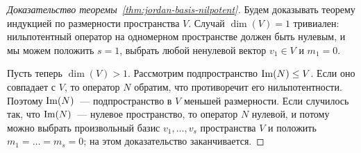 \begin{proof}[Доказательство теоремы~\ref{thm:jordan-basis-nilpotent}]
Будем доказывать теорему индукцией по размерности пространства $V$.
Случай $\dim(V)=1$ тривиален: нильпотентный оператор на одномерном
пространстве должен быть нулевым, и мы можем положить $s=1$, выбрать
любой ненулевой вектор $v_1\in V$ и $m_1=0$.

Пусть теперь $\dim(V)>1$. Рассмотрим подпространство $\operatorname{Im}(N)\leq V$.
Если оно совпадает с $V$, то оператор $N$ обратим, что противоречит
его нильпотентности. Поэтому $\operatorname{Im}(N)$~--- подпространство в $V$
меньшей размерности.
Если случилось так, что $\operatorname{Im}(N)$~--- нулевое пространство, то
оператор $N$ нулевой, и потому можно выбрать произвольный базис
$v_1,\dots,v_s$ пространства $V$ и положить $m_1=\dots=m_s=0$;
на этом доказательство заканчивается.


\end{proof}
